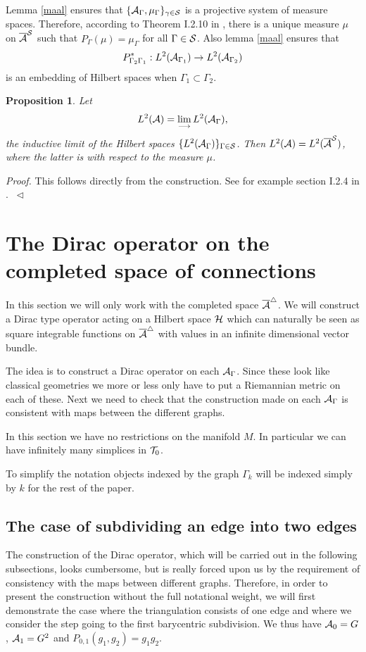 \documentclass[12pt]{article}
\newcommand{\eproof}{{~\hfill$ \triangleleft$}}
\def\ca{{\cal A}}
\def\ch{{\cal H}}
\def\cs{{\cal S}}
\def\ct{{\cal T}}
\newtheorem{prop}[thm]{Proposition}
\begin{document}
{Lemma \ref{maal} ensures that $\{ \ca_\Gamma ,\mu_\Gamma \}_{\gamma \in \cs}$ is a projective system of measure spaces. Therefore, according to Theorem I.2.10 in \cite{Th1}, there is a unique measure $\mu$ on $\overline{\ca}^\cs$ such that $P_\Gamma (\mu )=\mu_\Gamma$ for all $\Gamma \in \cs$. Also lemma \ref{maal} ensures that 
$$P^*_{\Gamma_2 \Gamma_1} :L^2(\ca_{\Gamma_1})\to L^2(\ca_{\Gamma_2})$$
is an  embedding of Hilbert spaces when $\Gamma_1 \subset \Gamma_2$. 
\begin{prop}\label{induktiv}
Let 
$$L^2(\ca)=\lim_{\longrightarrow}L^2(\ca_\Gamma ),$$
the inductive limit of the Hilbert spaces $\{ L^2 (\ca_\Gamma )\}_{\Gamma \in \cs}$. Then $L^2(\ca )=L^2(\overline{\ca}^\cs)$, where the latter is with respect to the measure $\mu$.
\end{prop}

\textit{Proof.} This follows directly from the construction. See for example section I.2.4 in \cite{Th1}. \eproof

\section{The Dirac operator on the completed space of connections} \label{dir}
In this section we will only work with the completed space $\overline{\ca}^\triangle$. We will construct a Dirac type operator acting on a Hilbert space $\ch$ which can naturally be seen as square integrable functions on $\overline{\ca}^\triangle$ with values in an infinite dimensional vector bundle.

The idea is to construct a Dirac operator on each $\ca_\Gamma$. Since these look like  classical geometries we more or less only have to put a Riemannian metric on each of these. Next we need to check that the construction made on each $\ca_\Gamma$ is consistent with maps between the different graphs. 

In this section we have no restrictions on the manifold $M$. In particular we can have infinitely many simplices in $\ct_0$.

To simplify the notation objects indexed by the  graph $\Gamma_k$ will be indexed simply by $k$ for the rest of the paper.

\subsection{The case of subdividing an edge into  two edges}
The construction of the Dirac operator, which will be carried out in the following subsections, looks cumbersome, but is really  forced upon us by the requirement of consistency with the maps between different graphs.  Therefore, in order to present the construction without the full notational weight, we will first demonstrate the case where the triangulation consists of one edge and where we consider the step going to the first barycentric subdivision. We thus have $\ca_0=G$, $\ca_1=G^2$ and $P_{0,1}(g_1,g_2)=g_1g_2$. 

}
\end{document}
